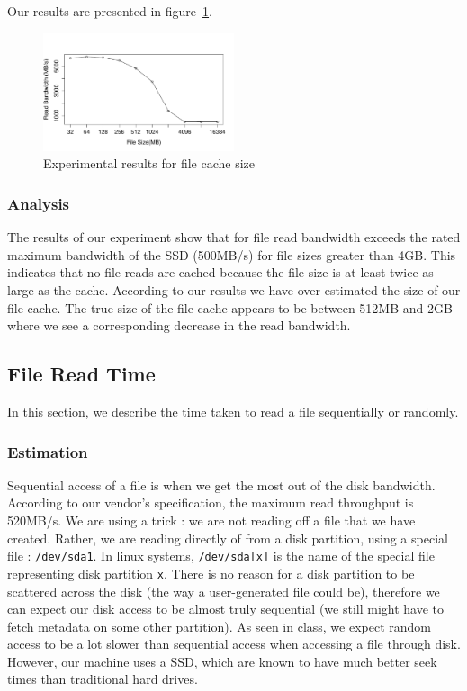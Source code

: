 Our results are presented in figure~\ref{figure:cacheresult}.

\begin{figure}
    \centering
    \includegraphics[width=0.5\textwidth]{cache-results.pdf}
    \caption{Experimental results for file cache size}
    \label{figure:cacheresult}
\end{figure}

\subsubsection{Analysis}

The results of our experiment show that for file read bandwidth exceeds the rated maximum bandwidth of the SSD (500MB/s) for file sizes greater than 4GB. This indicates that no file reads are cached because 
the file size is at least twice as large as the cache. According to our results we have over estimated the size of our file cache. The true size of the file cache appears to be between 512MB and 2GB where we 
see a corresponding decrease in the read bandwidth. 

\subsection{File Read Time}

In this section, we describe the time taken to read a file sequentially or randomly.

\subsubsection{Estimation}

Sequential access of a file is when we get the most out of the disk bandwidth. According to our vendor's specification, the maximum read throughput is 520MB/s. We are using a trick : we are not reading off a file that we have created. Rather, we are reading directly of from a disk partition, using a special file : \texttt{/dev/sda1}. In linux systems, \texttt{/dev/sda[x]} is the name of the special file representing disk partition \texttt{x}. There is no reason for a disk partition to be scattered across the disk (the way a user-generated file could be), therefore we can expect our disk access to be almost truly sequential (we still might have to fetch metadata on some other partition). As seen in class, we expect random access to be a lot slower than sequential access when accessing a file through disk. However, our machine uses a SSD, which are known to have much better seek times than traditional hard drives. 

